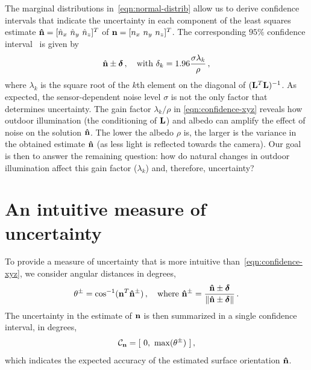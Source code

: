 The marginal distributions in~\eqref{eqn:normal-distrib} allow us to derive confidence intervals that indicate the uncertainty in each component of the least squares estimate ${\bf \hat n} = [ \hat n_x \ \hat n_y \ \hat n_z ]^T$ of ${\bf n} = [ n_x \ n_y \ n_z ]^T$. The corresponding $95\%$ confidence interval~\cite{hastie-book-09} is given by
%
\begin{equation}
\hat{\mathbf{n}} \pm \boldsymbol \delta \,, \quad \text{with } \delta_k = 1.96 \frac{\sigma\lambda_k}{\rho} \,,
\label{eqn:confidence-xyz}
\end{equation}
%
where $\lambda_k$ is the square root of the $k$th element on the diagonal of $({\bf L}^T{\bf L})^{-1}$. As expected, the sensor-dependent noise level $\sigma$ is not the only factor that determines uncertainty. The gain factor $\lambda_k/\rho$ in \eqref{eqn:confidence-xyz} reveals how outdoor illumination (the conditioning of ${\bf L}$) and albedo can amplify the effect of noise on the solution ${\bf \hat n}$. The lower the albedo $\rho$ is, the larger is the variance in the obtained estimate $\bf \hat n$ (as less light is reflected towards the camera). Our goal is then to answer the remaining question: how do natural changes in outdoor illumination affect this gain factor ($\lambda_k$) and, therefore, uncertainty?

\section{An intuitive measure of uncertainty}
\label{subsec:measure_uncertainty}

To provide a measure of uncertainty that is more intuitive than~\eqref{eqn:confidence-xyz}, we consider angular distances in degrees,
%
\begin{equation}
\theta^\pm = \cos^{-1}(\mathbf{n}^T{\bf \hat n}^\pm)\,,
\quad \text{where }
{\bf \hat n}^\pm = \frac{{\bf \hat n} \pm \boldsymbol \delta}{\lVert{\bf \hat n} \pm \boldsymbol \delta \rVert}\,.
\label{eqn:angular-dist}
\end{equation}
%
The uncertainty in the estimate of ${\bf n}$ is then summarized in a single confidence interval, in degrees,
%
\begin{equation}
\mathcal{C}_{\bf n} = [ \ 0, \ \max (\theta^\pm) \ ]\,,
\label{eqn:confidence-degrees}
\end{equation}
which indicates the expected accuracy of the estimated surface orientation ${\bf \hat n}$.

